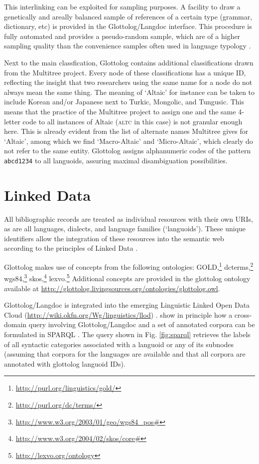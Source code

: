 \documentclass[10pt, a4paper]{article}
\begin{document}
This interlinking can be exploited for sampling purposes. A facility to draw a genetically and areally balanced sample of references of a certain type (grammar, dictionary, etc) is provided in the Glottolog/Langdoc interface. This procedure is fully automated and provides a pseudo-random sample, which are of a higher sampling quality than the convenience samples often used in language typology \cite{NordhoffEtAl2011alt}.


Next to the main classfication, Glottolog contains  additional classifications drawn from the Multitree project. Every node of these classifications has a unique ID, reflecting the insight that two researchers using the same name for a node do not always mean the same thing. The meaning of `Altaic' for instance can be taken to include Korean and/or Japanese next to Turkic, Mongolic, and Tungusic. This means that the practice of the Multitree project to assign one and the same 4-letter code to all instances of Altaic (\textsc{altc} in this case) is not granular enough here. This is already evident from the list of alternate names Multitree gives for `Altaic', among which we find `Macro-Altaic' and   `Micro-Altaic', which clearly do not refer to the same entity. Glottolog assigns alphanumeric codes of the pattern \texttt{abcd1234} to all languoids, assuring maximal disambiguation possibilities.
  
\section{Linked Data}

All bibliographic records are treated as individual resources with their own
URIs, as are all languages, dialects, and language families (`languoids'). These
unique identifiers allow the integration of these resources into the semantic web \cite{NordhoffEtAl2011iswc} according to the principles of Linked Data \cite{BernersLee2006,HeathEtAl2011}.

Glottolog makes use of concepts from the following ontologies:  
 GOLD,\footnote{\url{http://purl.org/linguistics/gold/}}
 dcterms,\footnote{\url{http://purl.org/dc/terms/}}
 wgs84,\footnote{\url{http://www.w3.org/2003/01/geo/wgs84_pos#}}
 skos,\footnote{\url{http://www.w3.org/2004/02/skos/core#}}
 lexvo.\footnote{\url{http://lexvo.org/ontology}}
 Additional concepts are provided in the glottolog ontology available at \url{http://glottolog.livingsources.org/ontologies/glottolog.owl}.
 
Glottolog/Langdoc is integrated into the emerging Linguistic Linked Open Data Cloud (\url{http://wiki.okfn.org/Wg/linguistics/llod}) \cite{ChiarcosEtAl2012tal,Nordhoff2012ldlglottolog}. \cite{ChiarcosEtAl2012ldlexamples} show in principle how a cross-domain query involving Glottolog/Langdoc and a set of annotated corpora can be formulated in SPARQL \cite{PrudhommeauxEtAl2008}. The query shown in Fig. \ref{fig:sparql} retrieves the labels of all syntactic categories associated with a languoid or any of its subnodes (assuming that corpora for the languages are available and that all corpora are annotated with glottolog languoid IDs).
\end{document}
